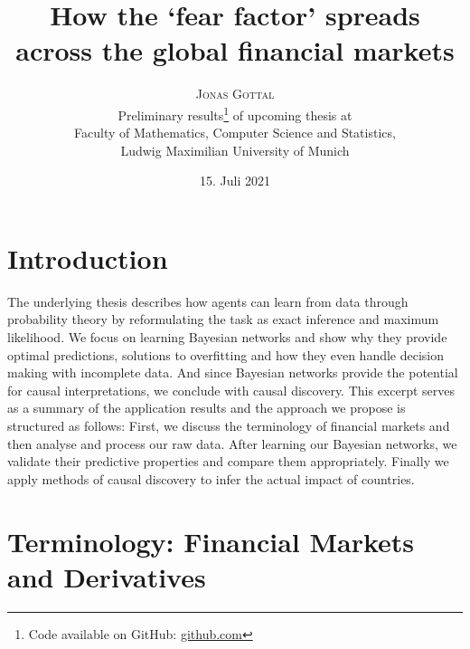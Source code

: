 \documentclass[twoside,twocolumn]{article}
\title{How the `fear factor' spreads across the global financial markets} %
\author{%
\textsc{Jonas Gottal}\\[1ex] %
\normalsize Preliminary results\thanks{Code available on GitHub:  \url{github.com}} of upcoming thesis at \\\normalsize Faculty of Mathematics, Computer Science and Statistics, \\\normalsize  Ludwig Maximilian University of Munich%
}
\date{15. Juli 2021} %
\begin{document}
\maketitle

\section{Introduction}
The underlying thesis describes how agents can learn from data through probability theory by reformulating the task as exact inference and maximum likelihood. We focus on learning Bayesian networks and show why they provide optimal predictions, solutions to overfitting and how they even handle decision making with incomplete data. And since Bayesian networks provide the potential for causal interpretations, we conclude with causal discovery.  
This excerpt serves as a summary of the application results and the approach we propose is structured as follows: First, we discuss the terminology of financial markets and then analyse and process our raw data. After learning our Bayesian networks, we validate their predictive properties and compare them appropriately. Finally we apply methods of causal discovery to infer the actual impact of countries.

\section{Terminology: Financial Markets and Derivatives}
\end{document}
